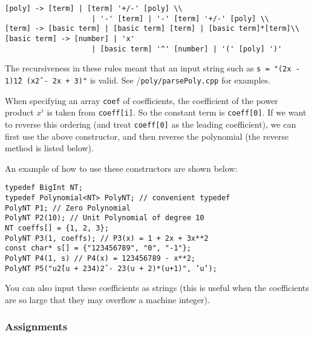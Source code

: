 \begin{verbatim}
[poly] -> [term] | [term] '+/-' [poly] \\
                    | '-' [term] | '-' [term] '+/-' [poly] \\
[term] -> [basic term] | [basic term] [term] | [basic term]*[term]\\
[basic term] -> [number] | 'x'
                    | [basic term] '^' [number] | '(' [poly] ')'
\end{verbatim}

The recursiveness in these rules meant that an input string such as
{\tt s = "(2x - 1)\^12 (x\^2 - 2x + 3)"} is valid.
See \progsdir/\texttt{poly/parsePoly.cpp} for examples. 

When specifying an array {\tt coef} of coefficients,
the coefficient of the power product $x^i$
is taken from {\tt coeff[i]}.  So the constant term is {\tt coeff[0]}.
If we want to reverse this ordering (and treat
{\tt coeff[0]} as the leading coefficient),
we can first use the above constructor, and then
reverse the polynomial (the reverse method is listed below).

An example of how to use these constructors are shown below:

\begin{progb}{
\> \tt typedef BigInt NT; \\
\> \tt typedef Polynomial<NT> PolyNT;  // convenient typedef \\
\> \tt PolyNT P1;     // Zero Polynomial \\
\> \tt PolyNT P2(10); // Unit Polynomial of degree 10\\
\> \tt NT coeffs[] = \{1, 2, 3\}; \\
\> \tt PolyNT P3(1, coeffs); // P3(x) = 1 + 2x + 3x**2\\
\> \tt const char* s[] = \{"123456789", "0", "-1"\}; \\
\> \tt PolyNT P4(1, s) // P4(x) = 123456789 - x**2; \\
\> \tt PolyNT P5("u\^2(u + 234)\^2 - 23(u + 2)*(u+1)", 'u');
}\end{progb}

You can also input these coefficients as strings (this
is useful when the coefficients are so large that
they may overflow a machine integer).

\subsubsection{Assignments}

